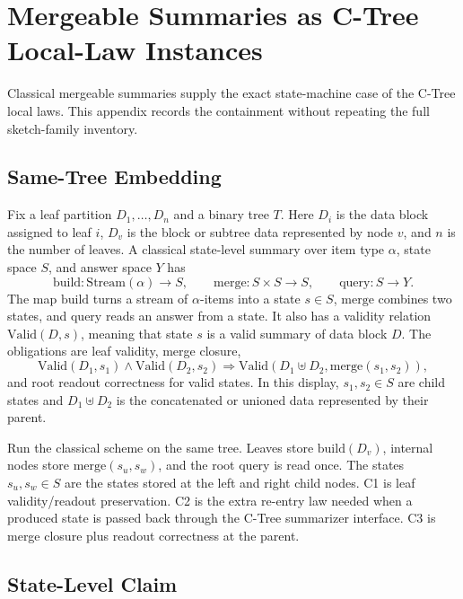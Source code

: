 \section{Mergeable Summaries as C-Tree Local-Law Instances}
\label{app:v8-mergeable-nesting}

Classical mergeable summaries supply the exact state-machine case of the
C-Tree local laws. This appendix records the containment without repeating the
full sketch-family inventory.

\subsection{Same-Tree Embedding}

Fix a leaf partition \(D_1,\ldots,D_n\) and a binary tree \(T\). Here
\(D_i\) is the data block assigned to leaf \(i\), \(D_v\) is the block or
subtree data represented by node \(v\), and \(n\) is the number of leaves. A
classical state-level summary over item type \(\alpha\), state space \(S\),
and answer space \(Y\) has
\[
  \mathrm{build}:\mathrm{Stream}(\alpha)\to S,\qquad
  \mathrm{merge}:S\times S\to S,\qquad
  \mathrm{query}:S\to Y.
\]
The map \(\mathrm{build}\) turns a stream of \(\alpha\)-items into a state
\(s\in S\), \(\mathrm{merge}\) combines two states, and
\(\mathrm{query}\) reads an answer from a state. It also has a validity
relation \(\mathrm{Valid}(D,s)\), meaning that state \(s\) is a valid summary
of data block \(D\). The obligations are leaf validity, merge closure,
\[
  \mathrm{Valid}(D_1,s_1)\wedge \mathrm{Valid}(D_2,s_2)
  \Rightarrow
  \mathrm{Valid}(D_1\uplus D_2,\mathrm{merge}(s_1,s_2)),
\]
and root readout correctness for valid states. In this display, \(s_1,s_2\in S\)
are child states and \(D_1\uplus D_2\) is the concatenated or unioned data
represented by their parent.

Run the classical scheme on the same tree. Leaves store
\(\mathrm{build}(D_v)\), internal nodes store
\(\mathrm{merge}(s_u,s_w)\), and the root query is read once. The states
\(s_u,s_w\in S\) are the states stored at the left and right child nodes. C1 is
leaf validity/readout preservation. C2 is the extra re-entry law needed when a
produced state is passed back through the C-Tree summarizer interface. C3 is
merge closure plus readout correctness at the parent.

\subsection{State-Level Claim}

